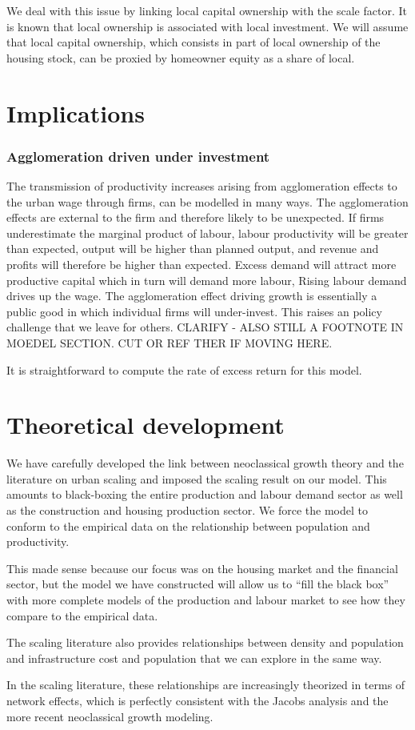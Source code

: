 We deal with this issue by linking local capital ownership with the scale factor. It is known that local ownership is associated with local investment. We will assume that local capital ownership, which consists in part of local ownership of the housing stock, can be proxied by homeowner equity as a share of local. 



\section{Implications}
\subsubsection{Agglomeration driven under investment}
The transmission of productivity increases arising from agglomeration effects  to the urban wage through firms, can be modelled in many ways. The agglomeration effects are external to the firm and therefore likely to be unexpected. If  firms underestimate the marginal product of labour, labour productivity will be greater than expected, output will be higher than planned output, and revenue and profits will therefore be higher than expected. Excess demand will attract more productive capital which in turn will demand more labour,  Rising labour demand drives up the wage. The agglomeration effect driving growth is essentially a public good in which individual firms will under-invest. This raises an policy challenge that we leave for others. CLARIFY - ALSO STILL A FOOTNOTE IN MOEDEL SECTION. CUT OR REF THER IF MOVING HERE.

 It is straightforward to compute the rate of excess return for  this model. 

 
\section{Theoretical development}%
We have carefully developed the link between neoclassical growth theory and the literature on urban scaling \cite{bettencourtIntroductionUrbanScience2021} and imposed the scaling result on our model. This amounts to black-boxing the entire production and labour demand sector as well as the construction and housing production sector. We force the model to conform to the empirical data on the relationship between population and productivity.

This made sense because our focus  was on the housing market and the financial sector, but the model we have constructed will allow us to ``fill the black box'' with more complete models of the production and labour market to see how they compare to the empirical data. 

The  scaling  literature also provides relationships between density and population and infrastructure cost and population that we can explore in the same way.

In the scaling literature, these relationships are increasingly theorized in terms of network effects, which is perfectly consistent with the Jacobs analysis and the more recent neoclassical growth modeling.

